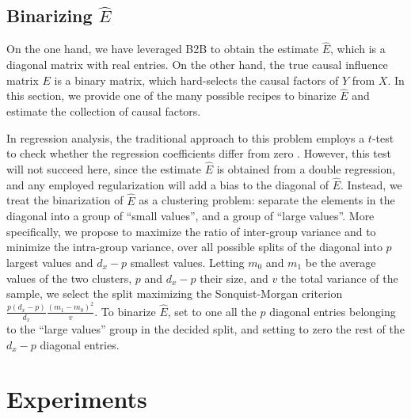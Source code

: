 \documentclass{article}
\begin{document}

\subsection{Binarizing $\hat{E}$}

On the one hand, we have leveraged B2B to obtain the estimate $\hat{E}$, which is a diagonal matrix with real entries.
%
On the other hand, the true causal influence matrix $E$ is a binary matrix, which hard-selects the causal factors of $Y$ from $X$.
%
In this section, we provide one of the many possible recipes to binarize $\hat{E}$ and estimate the collection of causal factors.

In regression analysis, the traditional approach to this problem employs a $t$-test to check whether the regression coefficients differ from zero \citep{student1908probable}.
%
However, this test will not succeed here, since the estimate $\hat{E}$ is obtained from a double regression, and any employed regularization will add a bias to the diagonal of $\hat{E}$.
%
Instead, we treat the binarization of $\hat{E}$ as a clustering problem: separate the elements in the diagonal into a group of ``small values'', and a group of ``large values''.
%
More specifically, we propose to maximize the ratio of inter-group variance and to minimize the intra-group variance, over all possible splits of the diagonal into $p$ largest values and $d_x-p$ smallest values.
%
Letting $m_0$ and $m_1$ be the average values of the two clusters, $p$ and $d_x-p$ their size, and $v$ the total variance of the sample, we select the split maximizing the Sonquist-Morgan \citep{sonquist_morgan} criterion $\frac{p(d_x-p)}{d_x} \frac{(m_1 - m_0)^2}{v}$.
%
To binarize $\hat{E}$, set to one all the $p$ diagonal entries belonging to the ``large values'' group in the decided split, and setting to zero the rest of the $d_x-p$ diagonal entries.

\section{Experiments}
\end{document}
